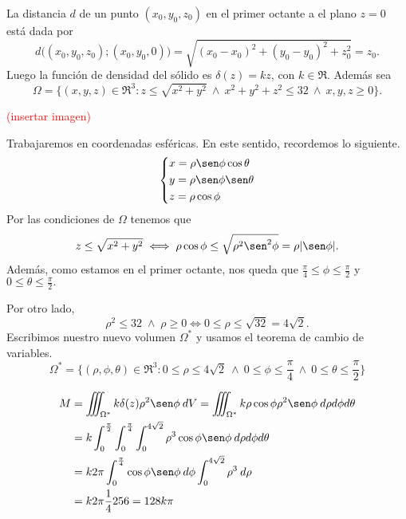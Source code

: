 \begin{solution}
    La distancia $d$ de un punto $(x_0,y_0,z_0)$ en el primer octante a el plano $z=0$ est\'a dada por $$d\Big(  (x_0,y_0,z_0); (x_0,y_0, 0) \Big)= \sqrt{(x_0-x_0)^2+(y_0-y_0)^2+z_0^2}=z_0.$$ Luego  la funci\'on de densidad del s\'olido es $\delta(z)=kz$,  con $k\in\Re$. Adem\'as  sea $$\Omega=\{(x,y,z)\in\Re^3:z\leq\sqrt{x^2+y^2}\:\land\:x^2+y^2+z^2\leq32\:\land\: x,y,z\geq0\}.$$
    
  
  \textcolor{red}{ (insertar imagen)} 
   
   
   
  Trabajaremos  en coordenadas esf\'ericas.  En este sentido,  recordemos lo siguiente.
    \[
    \begin{dcases}
        x=\rho\sen\phi\cos\theta\\
        y=\rho\sen\phi\sen\theta\\
        z=\rho\cos\phi
    \end{dcases}
    \]
    Por las condiciones de $\Omega$ tenemos que
    $$z\leq\sqrt{x^2+y^2}\iff\rho\cos\phi\leq\sqrt{\rho^2\sen^2\phi}=\rho |\sen\phi|.$$   
    Adem\'as, como estamos en el primer octante,  nos queda que $\frac{\pi}{4} \leq\phi\leq\frac{\pi}{2}$ y  $0\leq\theta\leq\frac{\pi}{2}.$
    
    Por otro lado,  $$ \rho^2\leq32  \; \land \;  \rho \geq 0 \iff     0\leq  \rho\leq\sqrt{32}= 4 \sqrt{2}.$$
    Escribimos nuestro nuevo volumen $\Omega^*$  y usamos el teorema de cambio de variables.
    \[
    \Omega^*=\{(\rho,\phi,\theta)\in\Re^3:0\leq\rho\leq4\sqrt{2}\:\land\:0\leq\phi\leq\frac{\pi}{4}\:\land\:0\leq\theta\leq\frac{\pi}{2}\}
    \]
  
  
    \begin{align*}
    M&=\iiint_{\Omega^*}k\delta(z)\rho^2\sen\phi\:dV=\iiint_{\Omega^*}k\rho\cos\phi\rho^2\sen\phi\:d\rho d\phi d\theta\\
    &=k\int_0^{\frac{\pi}{2}} \int_0^{\frac{\pi}{4}} \int_0^{4\sqrt{2}}\rho^3\cos\phi\sen\phi \:d\rho d\phi d\theta\\
    &=k2\pi\int_0^{\frac{\pi}{4}}\cos\phi\sen\phi\:d\phi\int_0^{4\sqrt{2}}\rho^3\:d\rho\\
    &=k2\pi\frac{1}{4}256=128k\pi
    \end{align*}
    
\end{solution}